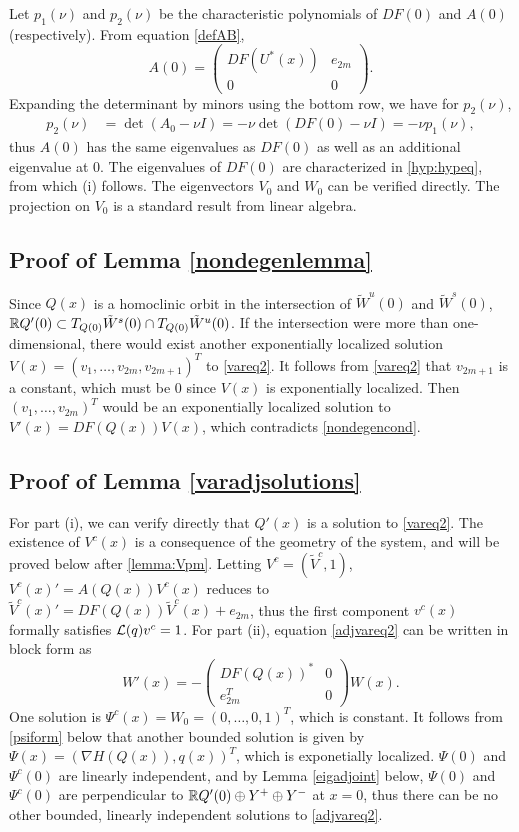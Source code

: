 \documentclass[10pt,reqno]{amsart}
\theoremstyle{plain}
\theoremstyle{definition}
\theoremstyle{remark}
\numberwithin{theorem}{section}
\numberwithin{equation}{section}
\begin{document}
Let $p_1(\nu)$ and $p_2(\nu)$ be the characteristic polynomials of $DF(0)$ and $A(0)$ (respectively). From equation \cref{defAB},
\begin{equation*}
A(0) = 
\begin{pmatrix}
DF(U^*(x)) & e_{2m}\\
0 & 0
\end{pmatrix}.
\end{equation*}
Expanding the determinant by minors using the bottom row, we have for $p_2(\nu)$,
\begin{align*}
p_2(\nu) &= \det(A_0 - \nu I) = -\nu \det(DF(0) - \nu I) = -\nu p_1(\nu),
\end{align*}
thus $A(0)$ has the same eigenvalues as $DF(0)$ as well as an additional eigenvalue at 0. The eigenvalues of $DF(0)$ are characterized in \cref{hyp:hypeq}, from which (i) follows. The eigenvectors $V_0$ and $W_0$ can be verified directly. The projection on $V_0$ is a standard result from linear algebra.

\subsection{Proof of Lemma \ref{nondegenlemma}}

Since $Q(x)$ is a homoclinic orbit in the intersection of $\tilde{W}^u(0)$ and $\tilde{W}^s(0)$, $\mathbb{R} Q'(0) \subset T_{Q(0)}\tilde{W}^s(0) \cap T_{Q(0)}\tilde{W}^u(0)$. If the intersection were more than one-dimensional, there would exist another exponentially localized solution $V(x) = (v_1, \dots, v_{2m}, v_{2m+1})^T$ to \eqref{vareq2}. It follows from \eqref{vareq2} that $v_{2m+1}$ is a constant, which must be 0 since $V(x)$ is exponentially localized. Then $(v_1, \dots, v_{2m})^T$ would be an exponentially localized solution to $V'(x) = DF(Q(x)) V(x)$, which contradicts \eqref{nondegencond}.

\subsection{Proof of Lemma \ref{varadjsolutions}}

For part (i), we can verify directly that $Q'(x)$ is a solution to \cref{vareq2}. The existence of $V^c(x)$ is a consequence of the geometry of the system, and will be proved below after \cref{lemma:Vpm}. Letting $V^c = (\tilde{V}^c, 1)$, $V^c(x)' = A(Q(x))V^c(x)$ reduces to $\tilde{V}^c(x)' = DF(Q(x)) \tilde{V}^c(x) + e_{2m}$, thus the first component $v^c(x)$ formally satisfies $\mathcal{L}(q)v^c = 1$. For part (ii), equation \cref{adjvareq2} can be written in block form as
\[
W'(x) = - 
\begin{pmatrix}DF(Q(x))^* & 0 \\ e_{2m}^T & 0 \end{pmatrix} W(x).
\]
One solution is $\Psi^c(x) = W_0 = (0, \dots, 0, 1)^T$, which is constant. It follows from \cref{psiform} below that another bounded solution is given by $\Psi(x) = ( \nabla H(Q(x)), q(x) )^T$, which is exponetially localized. $\Psi(0)$ and $\Psi^c(0)$ are linearly independent, and by Lemma \ref{eigadjoint} below, $\Psi(0)$ and $\Psi^c(0)$ are perpendicular to $\mathbb{R} Q'(0) \oplus Y^+ \oplus Y^-$ at $x = 0$, thus there can be no other bounded, linearly independent solutions to \eqref{adjvareq2}.
\end{document}
